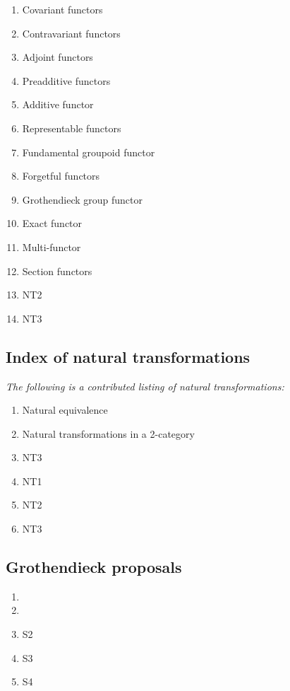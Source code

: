 \documentclass[12pt]{article}
\theoremstyle{plain}
\theoremstyle{definition}
\numberwithin{equation}{section}
\begin{document}
\begin{enumerate}
\item Covariant functors
\item Contravariant functors
\item Adjoint functors
\item Preadditive functors
\item Additive functor
\item Representable functors
\item Fundamental groupoid functor
\item Forgetful functors
\item Grothendieck group functor
\item Exact functor
\item Multi-functor
\item Section functors
\item NT2
\item NT3
\end{enumerate}


\subsection{Index of natural transformations}
\emph{The following is a contributed listing of natural transformations:}

\begin{enumerate}
\item Natural equivalence
\item Natural transformations in a 2-category
\item NT3
\item NT1
\item NT2
\item NT3
\end{enumerate}



\subsection{Grothendieck proposals}
\begin{enumerate}
\item {}
\item 
{}
\item S2
\item S3
\item S4

\end{enumerate}
\end{document}
